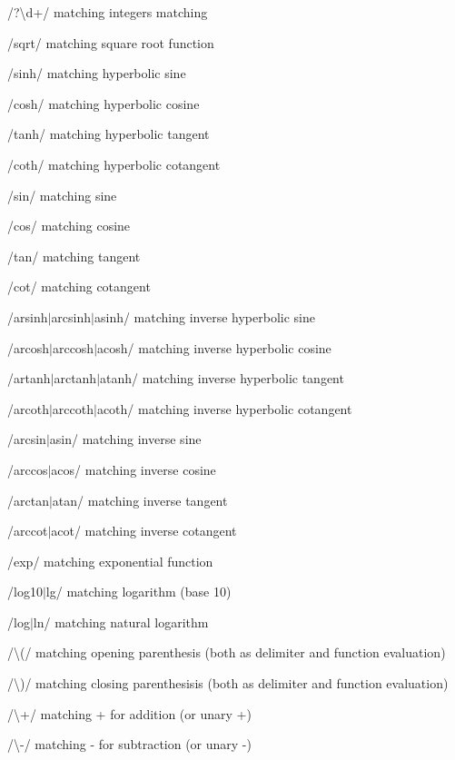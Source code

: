 \begin{DoxyItemize}
\item {\ttfamily /?\textbackslash{}d+/} matching integers matching
\item {\ttfamily /sqrt/} matching square root function
\item {\ttfamily /sinh/} matching hyperbolic sine
\item {\ttfamily /cosh/} matching hyperbolic cosine
\item {\ttfamily /tanh/} matching hyperbolic tangent
\item {\ttfamily /coth/} matching hyperbolic cotangent
\item {\ttfamily /sin/} matching sine
\item {\ttfamily /cos/} matching cosine
\item {\ttfamily /tan/} matching tangent
\item {\ttfamily /cot/} matching cotangent
\item {\ttfamily /arsinh$\vert$arcsinh$\vert$asinh/} matching inverse hyperbolic sine
\item {\ttfamily /arcosh$\vert$arccosh$\vert$acosh/} matching inverse hyperbolic cosine
\item {\ttfamily /artanh$\vert$arctanh$\vert$atanh/} matching inverse hyperbolic tangent
\item {\ttfamily /arcoth$\vert$arccoth$\vert$acoth/} matching inverse hyperbolic cotangent
\item {\ttfamily /arcsin$\vert$asin/} matching inverse sine
\item {\ttfamily /arccos$\vert$acos/} matching inverse cosine
\item {\ttfamily /arctan$\vert$atan/} matching inverse tangent
\item {\ttfamily /arccot$\vert$acot/} matching inverse cotangent
\item {\ttfamily /exp/} matching exponential function
\item {\ttfamily /log10$\vert$lg/} matching logarithm (base 10)
\item {\ttfamily /log$\vert$ln/} matching natural logarithm
\item {\ttfamily /\textbackslash{}(/} matching opening parenthesis (both as delimiter and function evaluation)
\item {\ttfamily /\textbackslash{})/} matching closing parenthesisis (both as delimiter and function evaluation)
\item {\ttfamily /\textbackslash{}+/} matching + for addition (or unary +)
\item {\ttfamily /\textbackslash{}-\//} matching -\/ for subtraction (or unary -\/)

\end{DoxyItemize}
